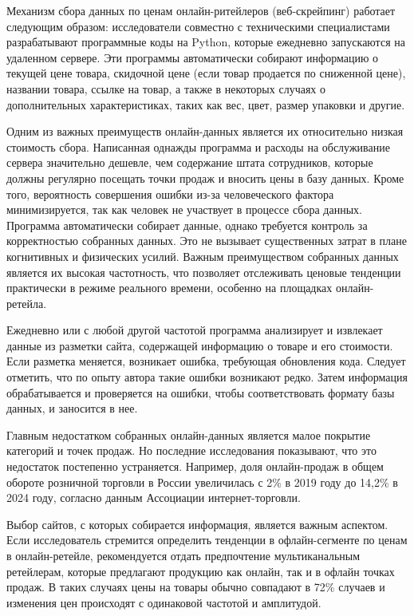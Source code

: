 Механизм сбора данных по ценам онлайн-ритейлеров (веб-скрейпинг) работает следующим образом: исследователи совместно с техническими специалистами разрабатывают программные коды на Python, которые ежедневно запускаются на удаленном сервере. Эти программы автоматически собирают информацию о текущей цене товара, скидочной цене (если товар продается по сниженной цене), названии товара, ссылке на товар, а также в некоторых случаях о дополнительных характеристиках, таких как вес, цвет, размер упаковки и другие.

Одним из важных преимуществ онлайн-данных является их относительно низкая стоимость сбора. Написанная однажды программа и расходы на обслуживание сервера значительно дешевле, чем содержание штата сотрудников, которые должны регулярно посещать точки продаж и вносить цены в базу данных. Кроме того, вероятность совершения ошибки из-за человеческого фактора минимизируется, так как человек не участвует в процессе сбора данных. Программа автоматически собирает данные, однако требуется контроль за корректностью собранных данных. Это не вызывает существенных затрат в плане когнитивных и физических усилий. Важным преимуществом собранных данных является их высокая частотность, что позволяет отслеживать ценовые тенденции практически в режиме реального времени, особенно на площадках онлайн-ретейла.

Ежедневно или с любой другой частотой программа анализирует и извлекает данные из разметки сайта, содержащей информацию о товаре и его стоимости. Если разметка меняется, возникает ошибка, требующая обновления кода. Следует отметить, что по опыту автора такие ошибки возникают редко. Затем информация обрабатывается и проверяется на ошибки, чтобы соответствовать формату базы данных, и заносится в нее.

Главным недостатком собранных онлайн-данных является малое покрытие категорий и точек продаж. Но последние исследования показывают, что это недостаток постепенно устраняется. Например, доля онлайн-продаж в общем обороте розничной торговли в России увеличилась с 2\% в 2019 году до 14,2\% в 2024 году, согласно данным Ассоциации интернет-торговли.

Выбор сайтов, с которых собирается информация, является важным аспектом. Если исследователь стремится определить тенденции в офлайн-сегменте по ценам в онлайн-ретейле, рекомендуется отдать предпочтение мультиканальным ретейлерам, которые предлагают продукцию как онлайн, так и в офлайн точках продаж. В таких случаях цены на товары обычно совпадают в 72\% случаев и изменения цен происходят с одинаковой частотой и амплитудой.

